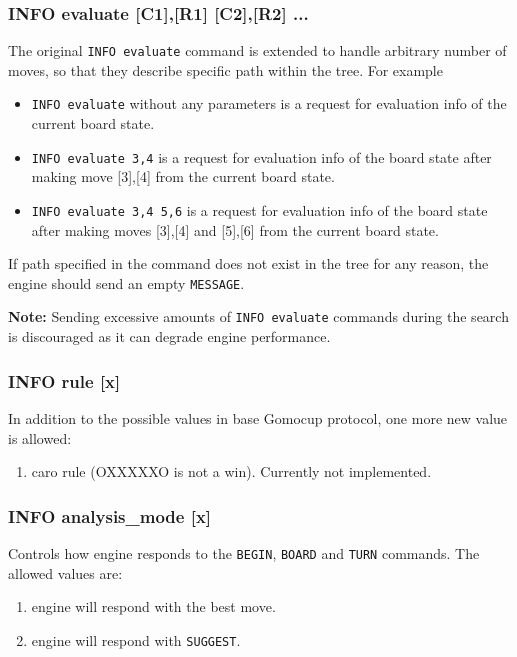 \documentclass[12pt,a4paper]{article}
\begin{document}
\subsubsection{INFO evaluate [C1],[R1] [C2],[R2] ...}
The original \texttt{INFO evaluate} command is extended to handle arbitrary number of moves, so that they describe specific path within the tree. For example 
\begin{itemize}
\item{\texttt{INFO evaluate} without any parameters is a request for evaluation info of the current board state.}
\item{\texttt{INFO evaluate 3,4} is a request for evaluation info of the board state after making move [3],[4] from the current board state.}
\item{\texttt{INFO evaluate 3,4 5,6} is a request for evaluation info of the board state after making moves [3],[4] and [5],[6] from the current board state.}
\end{itemize}
If path specified in the command does not exist in the tree for any reason, the engine should send an empty \texttt{MESSAGE}.

\textbf{Note:} Sending excessive amounts of \texttt{INFO evaluate} commands during the search is discouraged as it can degrade engine performance.

\subsubsection{INFO rule [x]}
\label{cmd_exinfo_rule}
In addition to the possible values in base Gomocup protocol, one more new value is allowed:
\begin{enumerate}[leftmargin=7.5em]
	\item[\text{$[x]=8$}]{caro rule (OXXXXXO is not a win). Currently not implemented.}
	\end{enumerate}

\subsubsection{INFO analysis{\_}mode [x]}
Controls how engine responds to the \texttt{BEGIN}, \texttt{BOARD} and \texttt{TURN} commands. The allowed values are:
\begin{enumerate}[leftmargin=7.5em]
	\item[\text{$[x]=0$}]{engine will respond with the best move.}
	\item[\text{$[x]=1$}]{engine will respond with \texttt{SUGGEST}.}
\end{enumerate}
\end{document}
